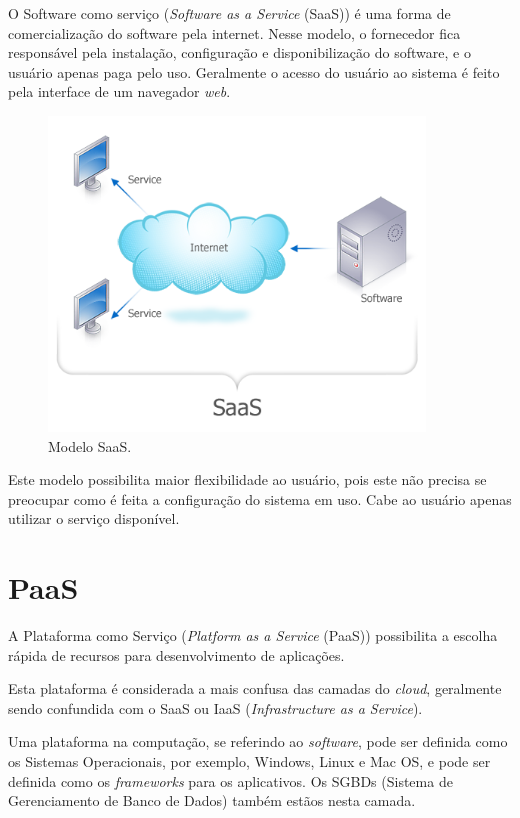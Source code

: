 \documentclass{abnt}
\begin{document}
	O Software como serviço (\textit{Software as a Service} (SaaS)) é uma forma 
	de comercialização do software pela internet. Nesse modelo, o fornecedor 
	fica responsável pela instalação, configuração e disponibilização do 
	software, e o usuário apenas paga pelo uso.
	Geralmente o acesso do usuário ao sistema é feito pela interface 
	de um navegador \textit{web}.

	\begin{figure}[h]
		\centering
		\includegraphics[width=10cm, keepaspectratio]{img/SaaS.png}
		\caption{Modelo SaaS.}
		\label{saas}
	\end{figure}
	
	Este modelo possibilita maior flexibilidade ao usuário, pois este não 
	precisa se preocupar como é feita a configuração do sistema em uso. Cabe 
	ao usuário apenas utilizar o serviço disponível.
	
	\section{PaaS}
		A Plataforma como Serviço (\textit{Platform as a Service} (PaaS)) possibilita a escolha rápida de recursos para desenvolvimento de aplicações.
		
		Esta plataforma é considerada a mais confusa das camadas do \textit{cloud}, geralmente sendo confundida com o SaaS ou IaaS (\textit{Infrastructure as a Service}).
		
		Uma plataforma na computação, se referindo ao \textit{software}, pode ser definida como os Sistemas Operacionais, por exemplo, Windows\texttrademark , Linux e Mac OS, e pode ser definida como os \textit{frameworks} para os aplicativos. Os SGBDs (Sistema de Gerenciamento de Banco de Dados) também estãos nesta camada.
	
\end{document}
